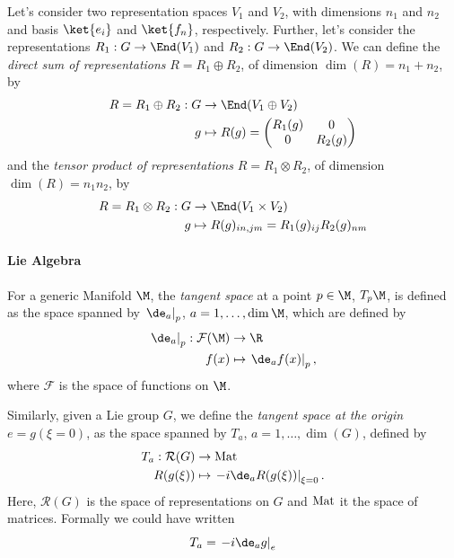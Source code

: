 Let's consider two representation spaces $V_1$ and $V_2$, with dimensions $n_1$ and $n_2$ and basis $\ket{e_i}$ and $\ket{f_n}$, respectively. Further, let's consider the representations $R_1: G \to \End(V_1)$ and $R_2: G \to \End(V_2)$. We can define the \emph{direct sum of representations} $R = R_1 \oplus R_2$, of dimension $\dim(R) = n_1 + n_2$, by
\begin{equation}
\begin{aligned}
    R = R_1 \oplus R_2 : G &\to \End(V_1 \oplus V_2) \\
    g &\mapsto R(g) = \begin{pmatrix}
        R_1(g) & 0 \\
        0 & R_2(g)
    \end{pmatrix}
\end{aligned}
\end{equation}
and the \emph{tensor product of representations} $R = R_1 \otimes R_2$, of dimension $\dim(R) = n_1 n_2$, by
\begin{equation}
\begin{aligned}
    R = R_1 \otimes R_2: G &\to \End(V_1 \times V_2) \\
    g &\mapsto R(g)_{in,jm} = R_1(g)_{ij} R_2(g)_{nm}
\end{aligned}
\end{equation}

\paragraph{Lie Algebra}
For a generic Manifold $\M$, the \emph{tangent space} at a point $p \in \M$, $T_p \M$, is defined as the space spanned by $\left. \de_a \right|_p$, $a = 1, \dots, \dim \M$, which are defined by
\begin{equation}
\begin{aligned}
    \left. \de_a \right|_p : \mathcal{F} (\M) &\to \R \\
    f(x) &\mapsto \left. \de_a f(x) \right|_p ,
\end{aligned}
\end{equation}
where $\mathcal{F}$ is the space of functions on $\M$.

Similarly, given a Lie group $G$, we define the \emph{tangent space at the origin} $e = g(\xi=0)$, as the space spanned by $T_a$, $a = 1, \dots, \dim(G)$, defined by
\begin{equation}
\begin{aligned}
    T_a : \mathcal{R}(G) &\to \textup{Mat} \\
    R(g(\xi)) &\mapsto \left. -i \de_a R(g(\xi)) \right|_{\xi=0} .
\end{aligned}
\end{equation}
Here, $\mathcal{R}(G)$ is the space of representations on $G$ and $\textup{Mat}$ it the space of matrices. Formally we could have written
\begin{equation}\label{eq:app-form}
    T_a = \left. -i \de_a g \right|_e
\end{equation}

